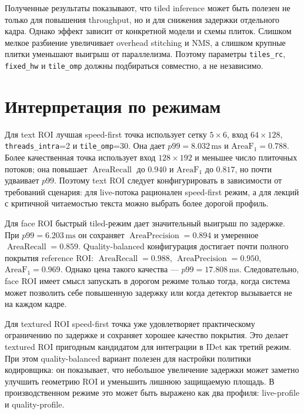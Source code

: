 \documentclass[12pt,a4paper,oneside,openany]{report}
\newcommand{\ms}{\mathrm{ms}}
\begin{document}
Полученные результаты показывают, что tiled inference может быть полезен не только для повышения throughput, но и для снижения задержки отдельного кадра. Однако эффект зависит от конкретной модели и схемы плиток. Слишком мелкое разбиение увеличивает overhead stitching и NMS, а слишком крупные плитки уменьшают выигрыш от параллелизма. Поэтому параметры \texttt{tiles\_rc}, \texttt{fixed\_hw} и \texttt{tile\_omp} должны подбираться совместно, а не независимо.


\section{Интерпретация по режимам}

Для text ROI лучшая speed-first точка использует сетку $5\times6$, вход $64\times128$, \texttt{threads\_intra}=2 и \texttt{tile\_omp}=30. Она дает $p99=8.032\,\ms$ и $\operatorname{AreaF_1}=0.788$. Более качественная точка использует вход $128\times192$ и меньшее число плиточных потоков; она повышает $\operatorname{AreaRecall}$ до $0.940$ и $\operatorname{AreaF_1}$ до $0.817$, но почти удваивает $p99$. Поэтому text ROI следует конфигурировать в зависимости от требований сценария: для live-потока рационален speed-first режим, а для лекций с критичной читаемостью текста можно выбрать более дорогой профиль.

Для face ROI быстрый tiled-режим дает значительный выигрыш по задержке. При $p99=6.203\,\ms$ он сохраняет $\operatorname{AreaPrecision}=0.894$ и умеренное $\operatorname{AreaRecall}=0.859$. Quality-balanced конфигурация достигает почти полного покрытия reference ROI: $\operatorname{AreaRecall}=0.988$, $\operatorname{AreaPrecision}=0.950$, $\operatorname{AreaF_1}=0.969$. Однако цена такого качества --- $p99=17.808\,\ms$. Следовательно, face ROI имеет смысл запускать в дорогом режиме только тогда, когда система может позволить себе повышенную задержку или когда детектор вызывается не на каждом кадре.

Для textured ROI speed-first точка уже удовлетворяет практическому ограничению по задержке и сохраняет хорошее качество покрытия. Это делает textured ROI пригодным кандидатом для интеграции в IDet как третий режим. При этом quality-balanced вариант полезен для настройки политики кодировщика: он показывает, что небольшое увеличение задержки может заметно улучшить геометрию ROI и уменьшить лишнюю защищаемую площадь. В производственном режиме это может быть выражено как два профиля: live-profile и quality-profile.
\end{document}
